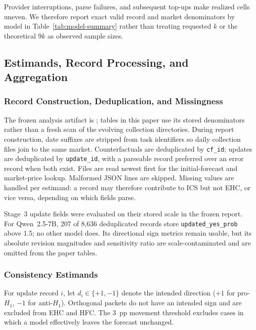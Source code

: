 Provider interruptions, parse failures, and subsequent top-ups make realized cells
uneven.  We therefore report exact valid record and market denominators by model in
Table~\ref{tab:model-summary} rather than treating requested \(k\) or the theoretical
\(9k\) as observed sample sizes.

\subsection{Estimands, Record Processing, and Aggregation}
\label{app:metrics}

\subsubsection{Record Construction, Deduplication, and Missingness}
\label{app:record-processing}

The frozen analysis artifact is
; tables in
this paper use its stored denominators rather than a fresh scan of the evolving
collection directories.  During report construction, date suffixes are stripped from
task identifiers so daily collection files join to the same market.  Counterfactuals
are deduplicated by \texttt{cf\_id}; updates are deduplicated by
\texttt{update\_id}, with a parseable record preferred over an error record when both
exist.  Files are read newest first for the initial-forecast and market-price lookup.
Malformed JSON lines are skipped.  Missing values are handled per estimand: a record
may therefore contribute to ICS but not EHC, or vice versa, depending on which fields
parse.

Stage~3 update fields were evaluated on their stored scale in the frozen report.
For Qwen~2.5-7B, 207 of 8,636 deduplicated records store
\texttt{updated\_yes\_prob} above 1.5; no other model does. Its directional sign
metrics remain usable, but its absolute revision magnitudes and sensitivity
ratio are scale-contaminated and are omitted from the paper tables.

\subsubsection{Consistency Estimands}
\label{app:metric-definitions}

For update record \(i\), let \(d_i\in\{+1,-1\}\) denote the intended direction
(\(+1\) for pro-$H_1$, \(-1\) for anti-$H_1$).  Orthogonal packets do not have an
intended sign and are excluded from EHC and HFC.  The 3~pp movement threshold excludes
cases in which a model effectively leaves the forecast unchanged.

